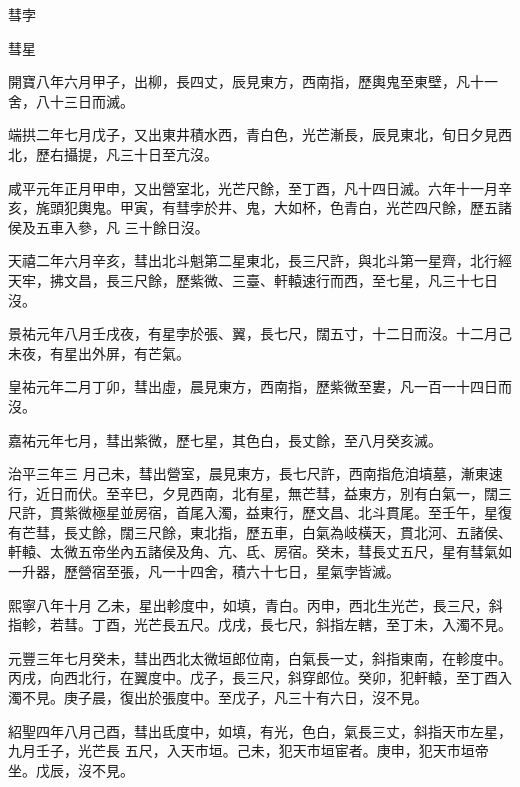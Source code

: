 \begin{pinyinscope}
 彗孛



 彗星



 開寶八年六月甲子，出柳，長四丈，辰見東方，西南指，歷輿鬼至東壁，凡十一舍，八十三日而滅。



 端拱二年七月戊子，又出東井積水西，青白色，光芒漸長，辰見東北，旬日夕見西北，歷右攝提，凡三十日至亢沒。



 咸平元年正月甲申，又出營室北，光芒尺餘，至丁酉，凡十四日滅。六年十一月辛亥，旄頭犯輿鬼。甲寅，有彗孛於井、鬼，大如杯，色青白，光芒四尺餘，歷五諸侯及五車入參，凡
 三十餘日沒。



 天禧二年六月辛亥，彗出北斗魁第二星東北，長三尺許，與北斗第一星齊，北行經天牢，拂文昌，長三尺餘，歷紫微、三臺、軒轅速行而西，至七星，凡三十七日沒。



 景祐元年八月壬戌夜，有星孛於張、翼，長七尺，闊五寸，十二日而沒。十二月己未夜，有星出外屏，有芒氣。



 皇祐元年二月丁卯，彗出虛，晨見東方，西南指，歷紫微至婁，凡一百一十四日而沒。



 嘉祐元年七月，彗出紫微，歷七星，其色白，長丈餘，至八月癸亥滅。



 治平三年三
 月己未，彗出營室，晨見東方，長七尺許，西南指危洎墳墓，漸東速行，近日而伏。至辛巳，夕見西南，北有星，無芒彗，益東方，別有白氣一，闊三尺許，貫紫微極星並房宿，首尾入濁，益東行，歷文昌、北斗貫尾。至壬午，星復有芒彗，長丈餘，闊三尺餘，東北指，歷五車，白氣為岐橫天，貫北河、五諸侯、軒轅、太微五帝坐內五諸侯及角、亢、氐、房宿。癸未，彗長丈五尺，星有彗氣如一升器，歷營宿至張，凡一十四舍，積六十七日，星氣孛皆滅。



 熙寧八年十月
 乙未，星出軫度中，如填，青白。丙申，西北生光芒，長三尺，斜指軫，若彗。丁酉，光芒長五尺。戊戌，長七尺，斜指左轄，至丁未，入濁不見。



 元豐三年七月癸未，彗出西北太微垣郎位南，白氣長一丈，斜指東南，在軫度中。丙戌，向西北行，在翼度中。戊子，長三尺，斜穿郎位。癸卯，犯軒轅，至丁酉入濁不見。庚子晨，復出於張度中。至戊子，凡三十有六日，沒不見。



 紹聖四年八月己酉，彗出氐度中，如填，有光，色白，氣長三丈，斜指天市左星，九月壬子，光芒長
 五尺，入天市垣。己未，犯天市垣宦者。庚申，犯天市垣帝坐。戊辰，沒不見。




\end{pinyinscope}
